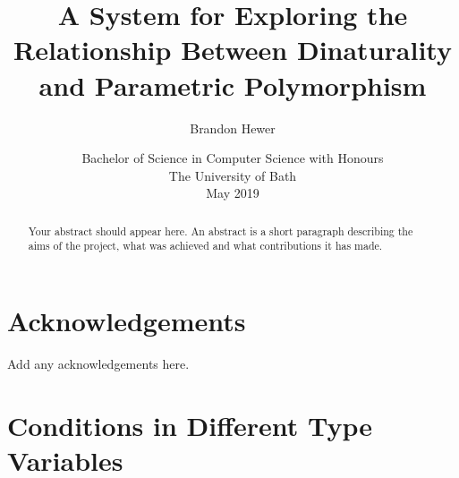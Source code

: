 \documentclass[11pt,openright,hidelinks,a4paper]{article}
\title{A System for Exploring the Relationship Between Dinaturality and Parametric Polymorphism}
\author{Brandon Hewer}
\date{Bachelor of Science in Computer Science with Honours\\The University of Bath\\May 2019}
\begin{document}
\maketitle

\newpage

\newpage


\newpage


\begin{abstract}

  
Your abstract should appear here.  An abstract is a short
paragraph describing the aims of the project, what was
achieved and what contributions it has made.
\end{abstract}
\newpage


\tableofcontents
\newpage
\listoffigures

\newpage

\section*{Acknowledgements}
Add any acknowledgements here.
\newpage

\setcounter{page}{1}


\newpage

\newpage

\newpage

\newpage

\newpage

\newpage

\newpage


\newpage



\newpage

\appendix

\section{Conditions in Different Type Variables}\label{app:differentvars}
\end{document}

